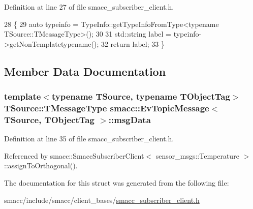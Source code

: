 Definition at line 27 of file smacc\+\_\+subscriber\+\_\+client.\+h.


\begin{DoxyCode}
28   \{
29     \textcolor{keyword}{auto} typeinfo = TypeInfo::getTypeInfoFromType<typename TSource::TMessageType>();
30 
31     std::string label = typeinfo->getNonTemplatetypename();
32     \textcolor{keywordflow}{return} label;
33   \}
\end{DoxyCode}


\subsection{Member Data Documentation}
\subsubsection[{\texorpdfstring{msg\+Data}{msgData}}]{\setlength{\rightskip}{0pt plus 5cm}template$<$typename T\+Source, typename T\+Object\+Tag$>$ T\+Source\+::\+T\+Message\+Type {\bf smacc\+::\+Ev\+Topic\+Message}$<$ T\+Source, T\+Object\+Tag $>$\+::msg\+Data}\hypertarget{structsmacc_1_1EvTopicMessage_adc167f5114cc3c4ff06ea9c810cc280f}{}\label{structsmacc_1_1EvTopicMessage_adc167f5114cc3c4ff06ea9c810cc280f}


Definition at line 35 of file smacc\+\_\+subscriber\+\_\+client.\+h.



Referenced by smacc\+::\+Smacc\+Subscriber\+Client$<$ sensor\+\_\+msgs\+::\+Temperature $>$\+::assign\+To\+Orthogonal().



The documentation for this struct was generated from the following file\+:\begin{DoxyCompactItemize}
\item 
smacc/include/smacc/client\+\_\+bases/\hyperlink{smacc__subscriber__client_8h}{smacc\+\_\+subscriber\+\_\+client.\+h}\end{DoxyCompactItemize}
